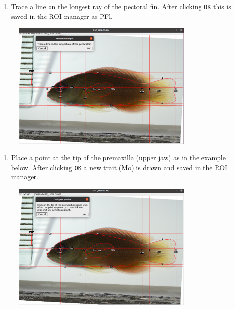 \documentclass[
  letterpaper,
]{scrbook}
\providecommand{\tightlist}{%
  \setlength{\itemsep}{0pt}\setlength{\parskip}{0pt}}\usepackage{longtable,booktabs,array}
\begin{document}
\begin{enumerate}
\def\labelenumi{\arabic{enumi}.}
\setcounter{enumi}{10}
\tightlist
\item
  Trace a line on the longest ray of the pectoral fin. After clicking
  \texttt{OK} this is saved in the ROI manager as PFl.
\end{enumerate}

\begin{figure}

{\centering \includegraphics[width=0.8\textwidth,height=\textheight]{./images/screenshots/pectoral_fin_length.png}

}

\end{figure}

\begin{enumerate}
\def\labelenumi{\arabic{enumi}.}
\setcounter{enumi}{11}
\tightlist
\item
  Place a point at the tip of the premaxilla (upper jaw) as in the
  example below. After clicking \texttt{OK} a new trait (Mo) is drawn
  and saved in the ROI manager.
\end{enumerate}

\begin{figure}

{\centering \includegraphics[width=0.8\textwidth,height=\textheight]{./images/screenshots/tip_upper_jaw.png}

}

\end{figure}
\end{document}
